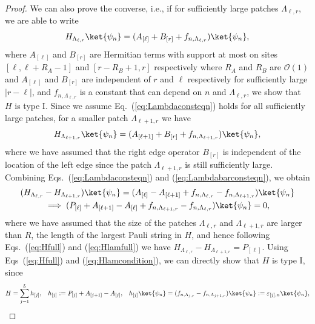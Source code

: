 \documentclass[prx,letterpaper,aps,superscriptaddress,floatfix,twocolumn,nofootinbib]{revtex4-2}
\theoremstyle{definition}
\newcommand{\nn}{\nonumber}
\newcommand{\defn}{:=}
\begin{document}
\begin{proof}
%
We can also prove the converse, i.e., if for sufficiently large patches $\Lambda_{\ell,r}$, we are able to write 
\begin{equation}
    H_{\Lambda_{\ell,r}}\ket{\psi_n} = (A_{[\ell]} + B_{[r]} + f_{n, \Lambda_{\ell, r}})\ket{\psi_n},
\label{eq:Lambdaconsteqn}
\end{equation}
where $A_{[\ell]}$ and $B_{[r]}$ are Hermitian terms with support at most on sites $[\ell, \ell + R_A -1]$ and $[r - R_B+1, r]$ respectively where $R_A$ and $R_B$ are $\mathcal{O}(1)$ and $A_{[\ell]}$ and $B_{[r]}$ are independent of $r$ and $\ell$ respectively for sufficiently large $|r-\ell|$, and $f_{n, \Lambda_{\ell, r}}$ is a constant that can depend on $n$ and $\Lambda_{\ell, r}$, we show that $H$ is type I. 
%
Since we assume Eq.~(\ref{eq:Lambdaconsteqn}) holds for all sufficiently large patches, for a smaller patch $\Lambda_{\ell+1,r}$ we have
\begin{equation}
    H_{ \Lambda_{\ell+1,r}}\ket{\psi_n} = (A_{[\ell+1]} + B_{[r]} +f_{n, \Lambda_{\ell+1, r}})\ket{\psi_n},  
\label{eq:Lambdabarconsteqn}
\end{equation}
where we have assumed that the right edge operator $B_{[r]}$ is independent of the location of the left edge since the patch $\Lambda_{\ell+1,r}$ is still sufficiently large. 
%
Combining Eqs.~(\ref{eq:Lambdaconsteqn}) and (\ref{eq:Lambdabarconsteqn}), we obtain
\begin{gather}
    (H_{\Lambda_{\ell,r}} - H_{ \Lambda_{\ell+1,r}})\ket{\psi_n} = (A_{[\ell]} - A_{[\ell+1]} + f_{n, \Lambda_{\ell, r}} - f_{n, \Lambda_{\ell+1, r}})\ket{\psi_n} \nn \\
    \implies (P_{[\ell]} + A_{[\ell+1]} - A_{[\ell]} + f_{n, \Lambda_{\ell+1, r}} - f_{n, \Lambda_{\ell, r}})\ket{\psi_n} = 0,  
\label{eq:Hlamcondition}
\end{gather}
where we have assumed that the size of the patches $\Lambda_{\ell,r}$ and $\Lambda_{\ell+1,r}$ are larger than $R$, the length of the largest Pauli string in $H$, and hence following Eqs.~(\ref{eq:Hfull}) and (\ref{eq:Hlamfull}) we have $H_{\Lambda_{\ell,r}} - H_{ \Lambda_{\ell+1,r}} = P_{[\ell]}$.
%
Using Eqs~(\ref{eq:Hfull}) and (\ref{eq:Hlamcondition}), we can directly show that $H$ is type I, since
\begin{equation}
    H = \sum_{j = 1}^L{h_{[j]}},\;\;\;h_{[j]} \defn P_{[j]} + A_{[j+1]} - A_{[j]},\;\;\;h_{[j]}\ket{\psi_n} = (f_{n, \Lambda_{j, r}} - f_{n, \Lambda_{j+1, r}})\ket{\psi_n} \defn \varepsilon_{[j], n}\ket{\psi_n}, 
\label{eq:TypeIproof}
\end{equation}

\end{proof}
\end{document}
